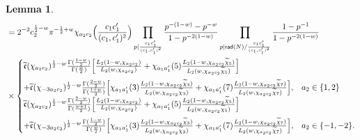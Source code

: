 \documentclass[12pt,reqno]{amsart}
\theoremstyle{plain}
\newtheorem{lemma}{Lemma}
\theoremstyle{remark}
\numberwithin{equation}{section}
\numberwithin{lemma}{section}
\numberwithin{theorem}{section}
\numberwithin{prop}{section}
\numberwithin{remark}{section}
\begin{document}
\begin{lemma}
\begin{align}
&=2^{-2} c_2^{\frac{1}{2}-w} \pi^{-\frac{1}{2}+w}
\chi_{a_2 c_2} \Big( \frac{c_1 c_1^{\prime}}{(c_1,c_1^{\prime})^2} \Big) 
\prod_{ p \mid \frac{c_1 c_1^{\prime}}{(c_1,c_1^{\prime})^2}}  \frac{p^{-(1-w)}-p^{-w}}{1-p^{-2(1-w)}}    
\prod_{p \mid \mathsf{rad}(N) / \frac{c_1 c_1^{\prime}}{(c_1,c_1^{\prime})^2 }} 
 \frac{1-p^{-1}}{1-p^{-2(1-w)}} \nonumber  \\
 & \times
 \begin{cases}
\widetilde{\mathfrak{c}}(\chi_{a_2 c_2})^{\frac{1}{2}-w} \frac{\Gamma(\frac{1-w}{2})}{\Gamma(\frac{w}{2})}
\Big [\frac{L_2(1-w,\chi_{a_2 c_2})}{L_2(w,\chi_{a_2 c_2})} 
+ 
\chi_{a_1 a_1^{\prime}}(5)  \frac{L_2(1-w,\chi_{a_2 c_2} \widetilde{\chi}_5)}{L_2(w,\chi_{a_2 c_2} \widetilde{\chi}_5)} \Big] \vspace{0.2cm} \\
+ \widetilde{\mathfrak{c}}(\chi_{-3a_2 c_2})^{\frac{1}{2}-w} \frac{\Gamma(\frac{2-w}{2})}{\Gamma(\frac{1+w}{2})}
\Big [ \chi_{a_1 a_1^{\prime}}(3) \frac{L_2(1-w,\chi_{a_2 c_2} \widetilde{\chi}_3 )}{L_2(w,\chi_{a_2 c_2} \widetilde{\chi}_3)} 
+ 
\chi_{a_1 a_1^{\prime}}(7)  \frac{L_2(1-w,\chi_{a_2 c_2} \widetilde{\chi}_7 )}{L_2(w,\chi_{a_2 c_2} \widetilde{\chi}_7)} \Big] , & a_2 \in \{1,2\} \\
\widetilde{\mathfrak{c}}(\chi_{a_2 c_2})^{\frac{1}{2}-w} \frac{\Gamma(\frac{2-w}{2})}{\Gamma(\frac{w+1}{2})}
\Big [\frac{L_2(1-w,\chi_{a_2 c_2})}{L_2(w,\chi_{a_2 c_2})} 
+ 
\chi_{a_1 a_1^{\prime}}(5)  \frac{L_2(1-w,\chi_{a_2 c_2} \widetilde{\chi}_5)}{L_2(w,\chi_{a_2 c_2} \widetilde{\chi}_5)} \Big] \vspace{0.2cm} \\
+ \widetilde{\mathfrak{c}}(\chi_{-3a_2 c_2})^{\frac{1}{2}-w} \frac{\Gamma(\frac{1-w}{2})}{\Gamma(\frac{w}{2})}
\Big [ \chi_{a_1 a_1^{\prime}}(3) \frac{L_2(1-w,\chi_{a_2 c_2} \widetilde{\chi}_3 )}{L_2(w,\chi_{a_2 c_2} \widetilde{\chi}_3)} 
+ 
\chi_{a_1 a_1^{\prime}}(7)  \frac{L_2(1-w,\chi_{a_2 c_2} \widetilde{\chi}_7 )}{L_2(w,\chi_{a_2 c_2} \widetilde{\chi}_7)} \Big] 
,   & a_2 \in \{-1,-2\}.
 \end{cases}
 \end{align}
\end{lemma}
\end{document}

